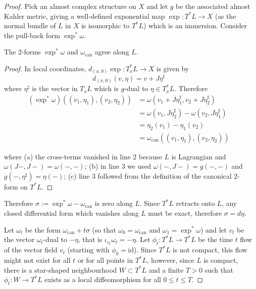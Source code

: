 \documentclass{article}
\begin{document}
\begin{proof}
  Pick an almost complex structure on $X$ and let $g$ be the associated almost Kahler metric, giving a well-defined exponential map $\exp\colon T^*L\to X$ (as the normal bundle of $L$ in $X$ is isomorphic to $T^*L$) which is an immersion. Consider the pull-back form $\exp^*\omega$.

  \begin{Claim}
    The 2-forms $\exp^*\omega$ and $\omega_{\mathrm{can}}$ agree along $L$.
  \end{Claim}
  \begin{proof}
    In local coordinates, $d_{(x,0)}\exp\colon T^*_xL\to X$ is given by
    \[d_{(x,0)}(v,\eta)=v+J\eta^{\sharp}\]
    where $\eta^{\sharp}$ is the vector in $T_xL$ which is $g$-dual to $\eta\in T^*_xL$. Therefore
    \[\begin{align*}
      (\exp^*\omega)((v_1,\eta_1),(v_2,\eta_2))&=\omega(v_1+J\eta_1^{\sharp},v_2+J\eta_2^{\sharp})\\
      &=\omega(v_1,J\eta_2^{\sharp})-\omega(v_2,J\eta_1^{\sharp})\\
      &=\eta_2(v_1)-\eta_1(v_2)\\
      &=\omega_{\mathrm{can}}((v_1,\eta_1),(v_2,\eta_2))
    \end{align*}\]

    where (a) the cross-terms vanished in line 2 because $L$ is Lagrangian and $\omega(J-,J-)=\omega(-,-)$; (b) in line 3 we used $\omega(-,J-)=g(-,-)$ and $g(-,\eta^{\sharp})=\eta(-)$; (c) line 3 followed from the definition of the canonical 2-form on $T^*L$.
  \end{proof}
  Therefore $\sigma:=\exp^*\omega-\omega_{\mathrm{can}}$ is zero along $L$. Since $T^*L$ retracts onto $L$, any closed differential form which vanishes along $L$ must be exact, therefore $\sigma=d\eta$.

  Let $\omega_t$ be the form $\omega_{\mathrm{can}}+t\sigma$ (so that $\omega_0=\omega_{\mathrm{can}}$ and $\omega_1=\exp^*\omega$) and let $v_t$ be the vector $\omega_t$-dual to $-\eta$, that is $\iota_{v_t}\omega_t=-\eta$. Let $\phi_t\colon T^*L\to T^*L$ be the time $t$ flow of the vector field $v_t$ (starting with $\phi_0=\mathrm{id}$). Since $T^*L$ is not compact, this flow might not exist for all $t$ or for all points in $T^*L$, however, since $L$ is compact, there is a star-shaped neighbourhood $W\subset T^*L$ and a finite $T>0$ such that $\phi_t\colon W\to T^*L$ exists as a local diffeomorphism for all $0\leq t\leq T$.


\end{proof}
\end{document}

